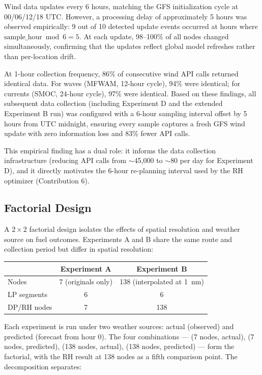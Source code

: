 \documentclass[review]{elsarticle}
\begin{document}

Wind data updates every 6 hours, matching the GFS initialization cycle at 00/06/12/18 UTC. However, a processing delay of approximately 5 hours was observed empirically: 9 out of 10 detected update events occurred at hours where $\text{sample\_hour} \bmod 6 = 5$. At each update, 98--100\% of all nodes changed simultaneously, confirming that the updates reflect global model refreshes rather than per-location drift.

At 1-hour collection frequency, 86\% of consecutive wind API calls returned identical data. For waves (MFWAM, 12-hour cycle), 94\% were identical; for currents (SMOC, 24-hour cycle), 97\% were identical. Based on these findings, all subsequent data collection (including Experiment D and the extended Experiment B run) was configured with a 6-hour sampling interval offset by 5 hours from UTC midnight, ensuring every sample captures a fresh GFS wind update with zero information loss and 83\% fewer API calls.

This empirical finding has a dual role: it informs the data collection infrastructure (reducing API calls from $\sim$45,000 to $\sim$80 per day for Experiment D), and it directly motivates the 6-hour re-planning interval used by the RH optimizer (Contribution 6).

\subsection{Factorial Design}
\label{sec:factorial}

A $2 \times 2$ factorial design isolates the effects of spatial resolution and weather source on fuel outcomes. Experiments A and B share the same route and collection period but differ in spatial resolution:

\begin{table}[h]
\centering
\begin{tabular}{lcc}
\toprule
 & Experiment A & Experiment B \\
\midrule
Nodes & 7 (originals only) & 138 (interpolated at 1~nm) \\
LP segments & 6 & 6 \\
DP/RH nodes & 7 & 138 \\
\bottomrule
\end{tabular}
\end{table}

Each experiment is run under two weather sources: actual (observed) and predicted (forecast from hour 0). The four combinations --- (7 nodes, actual), (7 nodes, predicted), (138 nodes, actual), (138 nodes, predicted) --- form the factorial, with the RH result at 138 nodes as a fifth comparison point. The decomposition separates:
\end{document}
